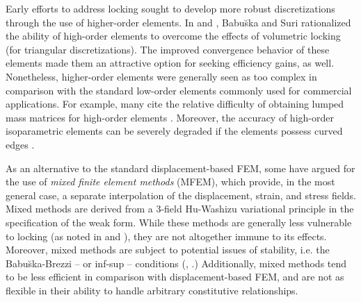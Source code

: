 		
		Early efforts to address locking sought to develop more robust discretizations through the use of higher-order elements. In \cite{Babuska&Suri:92:2} and \cite{Suri:91}, Babu\u{s}ka and Suri rationalized the ability of high-order elements to overcome the effects of volumetric locking (for triangular discretizations). The improved convergence behavior of these elements made them an attractive option for seeking efficiency gains, as well. Nonetheless, higher-order elements were generally seen as too complex in comparison with the standard low-order elements commonly used for commercial applications. For example, many cite the relative difficulty of obtaining lumped mass matrices for high-order elements \cite{Hughes:00}. Moreover, the accuracy of high-order isoparametric elements can be severely degraded if the elements possess curved edges \cite{Lee&Bathe:93}.
			
		As an alternative to the standard displacement-based FEM, some have argued for the use of \textit{mixed finite element methods} (MFEM), which provide, in the most general case, a separate interpolation of the displacement, strain, and stress fields. Mixed methods are derived from a 3-field Hu-Washizu variational principle in the specification of the weak form. While these methods are generally less vulnerable to locking (as noted in \cite{Babuska&Suri:92:2} and \cite{Babuska&Suri:92:1}), they are not altogether immune to its effects. Moreover, mixed methods are subject to potential issues of stability, i.e. the Babu\u{s}ka-Brezzi -- or inf-sup -- conditions (\cite{Babuska:71}, \cite{Brezzi:74}.) Additionally, mixed methods tend to be less efficient in comparison with displacement-based FEM, and are not as flexible in their ability to handle arbitrary constitutive relationships.
		
